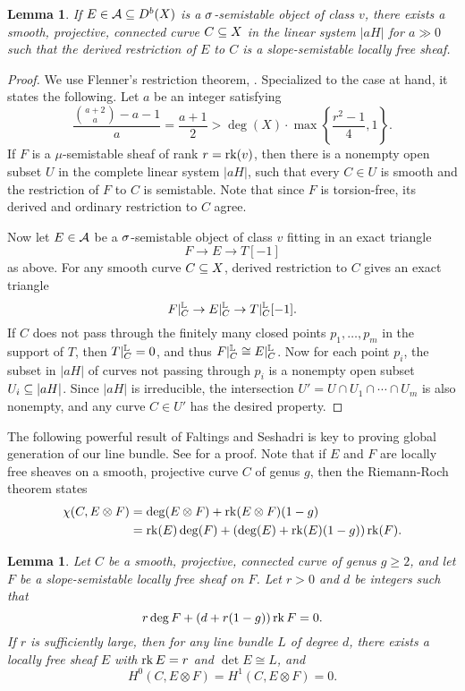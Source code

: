 \documentclass[letterpaper,11pt]{amsart}%
\newtheorem{lem}[thm]{Lemma}
\theoremstyle{remark}
\begin{document}
\begin{lem}\label{restsemistable}
    If $E \in \mathcal{A} \subseteq D^b(X)$ is a $\sigma$-semistable object of class $v$, there exists a smooth, projective, connected curve $C \subseteq X$ in the linear system $|a H|$ for $a \gg 0$ such that the derived restriction of $E$ to $C$ is a slope-semistable locally free sheaf.    
\end{lem}
\begin{proof} 
We use Flenner's restriction theorem, \cite[Theorem 7.1.1]{HL}. Specialized to the case at hand, it states the following. Let $a$ be an integer satisfying
\[ \frac{\binom{a+2}{a} - a - 1}{a} = \frac{a+1}{2} > \deg(X) \cdot \max\left\{\frac{r^2 - 1}{4}, 1\right\}. \]
If $F$ is a $\mu$-semistable sheaf of rank $r = \operatorname{\mathrm{rk}}(v)$, then there is a nonempty open subset $U$ in the complete linear system $|aH|$, such that every $C \in U$ is smooth and the restriction of $F$ to $C$ is semistable. Note that since $F$ is torsion-free, its derived and ordinary restriction to $C$ agree.

Now let $E \in \mathcal{A}$ be a $\sigma$-semistable object of class $v$ fitting in an exact triangle
\[ F \to E \to T[-1] \]
as above. For any smooth curve $C \subseteq X$, derived restriction to $C$ gives an exact triangle
\[ F|_C^{\mathbb{L}} \to E|_C^{\mathbb{L}} \to T|_C^{\mathbb{L}}[-1]. \]
If $C$ does not pass through the finitely many closed points $p_1,\ldots,p_m$ in the support of $T$, then $T|_C^{\mathbb{L}} = 0$, and thus $F|_C^{\mathbb{L}} \cong E|_C^{\mathbb{L}}$. Now for each point $p_i$, the subset in $|a H|$ of curves not passing through $p_i$ is a nonempty open subset $U_i \subseteq |a H|$. Since $|a H|$ is irreducible, the intersection $U' = U \cap U_1 \cap \cdots \cap U_m$ is also nonempty, and any curve $C \in U'$ has the desired property. 
\end{proof}

The following powerful result of Faltings and Seshadri is key to proving global generation of our line bundle. See \cite[Lemma 3.1, Remark 3.2]{seshadri} for a proof. Note that if $E$ and $F$ are locally free sheaves on a smooth, projective curve $C$ of genus $g$, then the Riemann-Roch theorem states
\begin{align*} 
    \chi(C, E \otimes F) & = \deg(E \otimes F) + \operatorname{\mathrm{rk}}(E \otimes F)(1-g) \\ 
    & = \operatorname{\mathrm{rk}}(E) \deg(F) + (\deg(E) + \operatorname{\mathrm{rk}}(E)(1-g))\operatorname{\mathrm{rk}}(F).
\end{align*}
\begin{lem}\label{seshadrimainlemma}
    Let $C$ be a smooth, projective, connected curve of genus $g \ge 2$, and let $F$ be a slope-semistable locally free sheaf on $F$. Let $r >0$ and $d$ be integers such that
    \[ r \deg F + (d + r(1-g)) \operatorname{\mathrm{rk}} F = 0. \]
    If $r$ is sufficiently large, then for any line bundle $L$ of degree $d$, there exists a locally free sheaf $E$ with $\operatorname{\mathrm{rk}} E = r$ and $\det E \cong L$, and
    \[ H^0(C, E \otimes F) = H^1(C, E \otimes F) = 0. \]
\end{lem}
\end{document}
